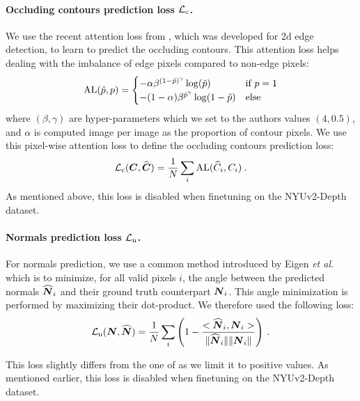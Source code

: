 \documentclass[10pt,twocolumn,letterpaper]{article}
\begin{document}
\paragraph{Occluding contours prediction loss $\mathcal{L}_{\text{c}}$.}

We use the recent attention loss from \cite{DOOBNet}, which was developed for 2d
edge detection, to learn to predict the occluding contours. This attention loss
helps dealing with  the imbalance of edge pixels compared to non-edge pixels:
\begin{equation}
  \text{AL}(\hat{p}, p) = \begin{cases}
    -\alpha\beta^{(1-\hat{p})^\gamma}\log(\hat{p}) &\text{if } p = 1\\
    -(1 - \alpha)\beta^{\hat{p}^\gamma}\log(1-\hat{p}) &\text{else}
  \end{cases}
\end{equation}
where $(\beta, \gamma)$ are hyper-parameters which  we set to the authors values
$(4,  0.5)$, and  $\alpha$  is computed  image  per image  as  the proportion  
of contour pixels. We use this pixel-wise  attention loss to define the 
occluding contours prediction loss:
\begin{equation}
  \mathcal{L}_{\text{c}}(\boldsymbol{C}, \widehat{\boldsymbol{C}}) = \frac{1}{N} \sum_i \text{AL}(\widehat{C}_i, C_i) \> .
\end{equation}
As mentioned  above, this loss  is disabled  when finetuning on  the NYUv2-Depth
dataset.


\paragraph{Normals prediction loss $\mathcal{L}_{\text{n}}$.}

For normals prediction, we use a common method introduced by Eigen \emph{et 
al.}~\cite{Eigen2015PredictingDS} which is to minimize, for all valid pixels 
$i$, the angle between the predicted normals  $\widehat{\boldsymbol{N}}_i$ and their ground 
truth counterpart $\boldsymbol{N}_i$. This angle minimization is performed by maximizing 
their dot-product. We therefore used the following loss:
\begin{equation}
  \mathcal{L}_{\text{n}}(\boldsymbol{N},\widehat{\boldsymbol{N}}) = \frac{1}{N} \sum_i \left(1 - \dfrac{<\widehat{\boldsymbol{N}}_i,
    \boldsymbol{N}_i>}{\|\widehat{\boldsymbol{N}}_i\|\|\boldsymbol{N}_i\|}\right) \> .
\end{equation}

This loss  slightly differs from  the one of \cite{Eigen2015PredictingDS}  as we
limit it  to positive values. As  mentioned earlier, this loss  is disabled when
finetuning on the NYUv2-Depth dataset.
\end{document}
